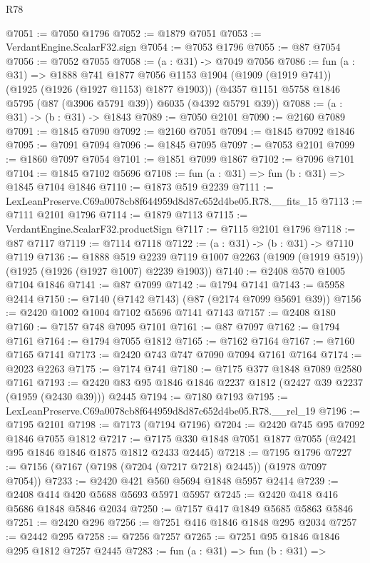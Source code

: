 \begin{lexlean}{R78}
\begin{coremodule}
@7051 := @7050 @1796
@7052 := @1879 @7051
@7053 := VerdantEngine.ScalarF32.sign
@7054 := @7053 @1796
@7055 := @87 @7054
@7056 := @7052 @7055
@7058 := (a : @31) -> @7049 @7056
@7086 := fun (a : @31) =>
  @1888
    @741
    @1877
    @7056
    @1153
    @1904
    (@1909 (@1919 @741))
    (@1925 (@1926 (@1927 @1153) @1877 @1903))
    (@4357 @1151 @5758 @1846 @5795 (@87 (@3906 @5791 @39)) @6035 (@4392 @5791 @39))
@7088 := (a : @31) -> (b : @31) -> @1843
@7089 := @7050 @2101
@7090 := @2160 @7089
@7091 := @1845 @7090
@7092 := @2160 @7051
@7094 := @1845 @7092 @1846
@7095 := @7091 @7094
@7096 := @1845 @7095
@7097 := @7053 @2101
@7099 := @1860 @7097 @7054
@7101 := @1851 @7099 @1867
@7102 := @7096 @7101
@7104 := @1845 @7102 @5696
@7108 := fun (a : @31) => fun (b : @31) => @1845 @7104 @1846
@7110 := @1873 @519 @2239
@7111 := LexLeanPreserve.C69a0078cb8f644959d8d87c652d4be05.R78.__fits_15
@7113 := @7111 @2101 @1796
@7114 := @1879 @7113
@7115 := VerdantEngine.ScalarF32.productSign
@7117 := @7115 @2101 @1796
@7118 := @87 @7117
@7119 := @7114 @7118
@7122 := (a : @31) -> (b : @31) -> @7110 @7119
@7136 := @1888
    @519
    @2239
    @7119
    @1007
    @2263
    (@1909 (@1919 @519))
    (@1925 (@1926 (@1927 @1007) @2239 @1903))
@7140 := @2408 @570 @1005 @7104 @1846
@7141 := @87 @7099
@7142 := @1794 @7141
@7143 := @5958 @2414
@7150 := @7140 (@7142 @7143) (@87 (@2174 @7099 @5691 @39))
@7156 := @2420 @1002 @1004 @7102 @5696 @7141 @7143
@7157 := @2408 @180
@7160 := @7157 @748 @7095 @7101
@7161 := @87 @7097
@7162 := @1794 @7161
@7164 := @1794 @7055 @1812
@7165 := @7162 @7164
@7167 := @7160 @7165 @7141
@7173 := @2420 @743 @747 @7090 @7094 @7161 @7164
@7174 := @2023 @2263
@7175 := @7174 @741
@7180 := @7175 @377 @1848 @7089 @2580 @7161
@7193 := @2420 @83 @95 @1846 @1846 @2237 @1812 (@2427 @39 @2237 (@1959 (@2430 @39))) @2445
@7194 := @7180 @7193
@7195 := LexLeanPreserve.C69a0078cb8f644959d8d87c652d4be05.R78.__rel_19
@7196 := @7195 @2101
@7198 := @7173 (@7194 @7196)
@7204 := @2420 @745 @95 @7092 @1846 @7055 @1812
@7217 := @7175 @330 @1848 @7051 @1877 @7055 (@2421 @95 @1846 @1846 @1875 @1812 @2433 @2445)
@7218 := @7195 @1796
@7227 := @7156 (@7167 (@7198 (@7204 (@7217 @7218) @2445)) (@1978 @7097 @7054))
@7233 := @2420 @421 @560 @5694 @1848 @5957 @2414
@7239 := @2408 @414 @420 @5688 @5693 @5971 @5957
@7245 := @2420 @418 @416 @5686 @1848 @5846 @2034
@7250 := @7157 @417 @1849 @5685 @5863 @5846
@7251 := @2420 @296
@7256 := @7251 @416 @1846 @1848 @295 @2034
@7257 := @2442 @295
@7258 := @7256 @7257
@7265 := @7251 @95 @1846 @1846 @295 @1812 @7257 @2445
@7283 := fun (a : @31) =>
  fun (b : @31) =>

\end{coremodule}
\end{lexlean}
